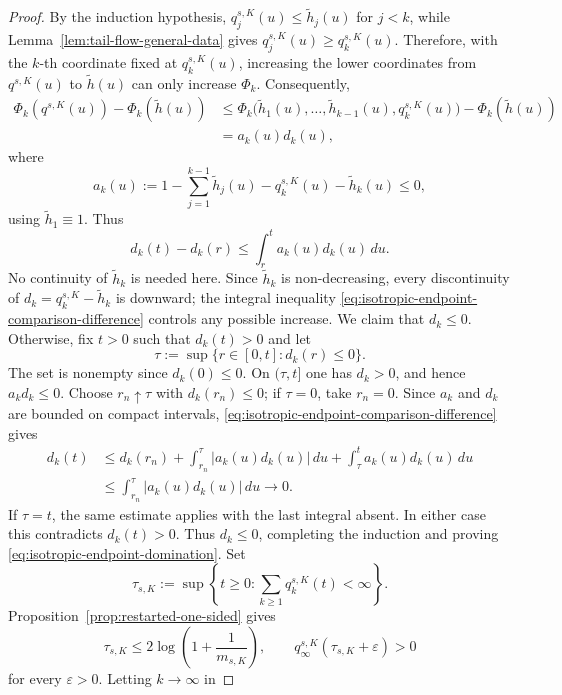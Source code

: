 \documentclass[11pt,a4paper]{amsart}
\theoremstyle{remark}
\begin{document}
\begin{proof}
By the induction hypothesis,
\(q^{s,K}_j(u)\leq\widetilde h_j(u)\) for \(j<k\), while
Lemma~\ref{lem:tail-flow-general-data} gives
\(q^{s,K}_j(u)\geq q^{s,K}_k(u)\). Therefore, with the \(k\)-th
coordinate fixed at \(q^{s,K}_k(u)\), increasing the lower coordinates
from \(q^{s,K}(u)\) to \(\widetilde h(u)\) can only increase
\(\Phi_k\). Consequently,
\[
\begin{aligned}
        \Phi_k(q^{s,K}(u))-\Phi_k(\widetilde h(u))
        &\leq
        \Phi_k\bigl(
        \widetilde h_1(u),\ldots,\widetilde h_{k-1}(u),
        q^{s,K}_k(u)
        \bigr)
        -\Phi_k(\widetilde h(u))  \\
        &=
        a_k(u)d_k(u),
\end{aligned}
\]
where
\[
        a_k(u)
        :=
        1-\sum_{j=1}^{k-1}\widetilde h_j(u)
        -q^{s,K}_k(u)-\widetilde h_k(u)
        \leq0,
\]
using $\tilde h_1 \equiv 1$. 
Thus
\begin{equation}
\label{eq:isotropic-endpoint-comparison-difference}
d_k(t)-d_k(r)
\leq
\int_r^t a_k(u)d_k(u)\,du.
\end{equation}
No continuity of $\widetilde h_k$ is needed here. Since
$\widetilde h_k$ is non-decreasing, every discontinuity of
$d_k=q_k^{s,K}-\widetilde h_k$ is downward; the integral inequality
\eqref{eq:isotropic-endpoint-comparison-difference} controls any possible
increase.
We claim that $d_k\leq0$. Otherwise, fix $t>0$ such that $d_k(t)>0$ and
let
\[
\tau:=\sup\{r\in[0,t]:d_k(r)\leq0\}.
\]
The set is nonempty since $d_k(0)\leq0$. On $(\tau,t]$ one has
$d_k>0$, and hence $a_kd_k\leq0$. Choose $r_n\uparrow\tau$ with
$d_k(r_n)\leq0$; if $\tau=0$, take $r_n=0$. Since $a_k$ and $d_k$ are
bounded on compact intervals, \eqref{eq:isotropic-endpoint-comparison-difference}
gives
\[
\begin{aligned}
d_k(t)
&\leq
d_k(r_n)
+\int_{r_n}^{\tau}|a_k(u)d_k(u)|\,du
+\int_{\tau}^{t}a_k(u)d_k(u)\,du \\
&\leq
\int_{r_n}^{\tau}|a_k(u)d_k(u)|\,du
\longrightarrow0.
\end{aligned}
\]
If $\tau=t$, the same estimate applies with the last integral absent.
In either case this contradicts $d_k(t)>0$. Thus $d_k\leq0$, completing
the induction and proving \eqref{eq:isotropic-endpoint-domination}.
Set
\[
\tau_{s,K}
:=
\sup\left\{t\geq0:
\sum_{k\geq1}q_k^{s,K}(t)<\infty\right\}.
\]
Proposition~\ref{prop:restarted-one-sided} gives
\[
\tau_{s,K}
\leq
2\log\left(1+\frac1{m_{s,K}}\right),
\qquad
q_\infty^{s,K}(\tau_{s,K}+\varepsilon)>0
\]
for every $\varepsilon>0$. Letting $k\to\infty$ in

\end{proof}
\end{document}
